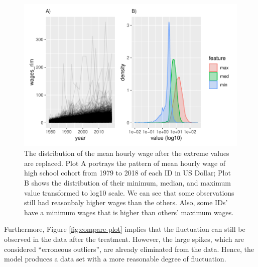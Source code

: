 \documentclass{article}
\begin{document}
\begin{figure}
\centering
\includegraphics{figures/comppict-1.pdf}
\caption{\label{fig:comppict}The distribution of the mean hourly wage after the extreme values are replaced. Plot A portrays the pattern of mean hourly wage of high school cohort from 1979 to 2018 of each ID in US Dollar; Plot B shows the distribution of their minimum, median, and maximum value transformed to log10 scale. We can see that some observations still had reasonbaly higher wages than the others. Also, some IDs' have a minimum wages that is higher than others' maximum wages.}
\end{figure}

Furthermore, Figure \ref{fig:compare-plot} implies that the fluctuation can still be observed in the data after the treatment. However, the large spikes, which are considered ``erroneous outliers'', are already eliminated from the data. Hence, the model produces a data set with a more reasonable degree of fluctuation.
\end{document}
